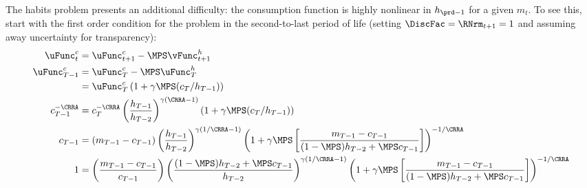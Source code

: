\documentclass[\econtexRoot/SolvingMicroDSOPs]{subfiles}
\begin{document}
The habits problem presents an additional difficulty: the consumption
function is highly nonlinear in $h_{\prd-1}$ for a given $m_{t}$.   To
see this, start with the first order condition for the problem in the
second-to-last period of life (setting $\DiscFac = \RNrm_{t+1} = 1$ and assuming
away uncertainty for transparency):
\begin{equation}\begin{gathered}\begin{aligned}
  \uFunc_{t}^c    & = \uFunc_{t+1}^c - \MPS \vFunc_{t+1}^{h}
  \\      \uFunc_{T-1}^c  & = \uFunc_{T}^c - \MPS \uFunc_{T}^{h}
  \\   & =  \uFunc_{T}^{c}\left(1 + \gamma \MPS
         (c_{T}/h_{T-1})\right)
  \\      c_{T-1}^{-\CRRA}
                    & =                                      c_{T}^{-\CRRA}\left(\frac{h_{T-1}}{h_{T-2}}\right)^{\gamma(\CRRA-1)}\left(1 + \gamma \MPS
                      (c_{T}/h_{T-1})\right)  \\
  c_{T-1}
                    & =                     (m_{T-1}-c_{T-1})\left(\frac{h_{T-1}}{h_{T-2}}\right)^{\gamma(1/\CRRA-1)}\left(1 +
                      \gamma \MPS \left[\frac{{m}_{T-1}-c_{T-1}}{(1-\MPS)h_{T-2}+\MPS
                      c_{T-1}}\right]\right)^{-1/\CRRA}
  \\      1
                    & =                     \left(\frac{{m}_{T-1}-c_{T-1}}{{c}_{T-1}}\right)\left(\frac{(1-\MPS)h_{T-2}+\MPS c_{T-1}}{h_{T-2}}\right)^{\gamma(1/\CRRA-1)}\left(1 +
                      \gamma \MPS \left[\frac{{m}_{T-1}-c_{T-1}}{(1-\MPS)h_{T-2}+\MPS
                      c_{T-1}}\right]\right)^{-1/\CRRA} \nonumber
  \\ \label{eq:oneeq}
\end{aligned}\end{gathered}\end{equation}
\end{document}
